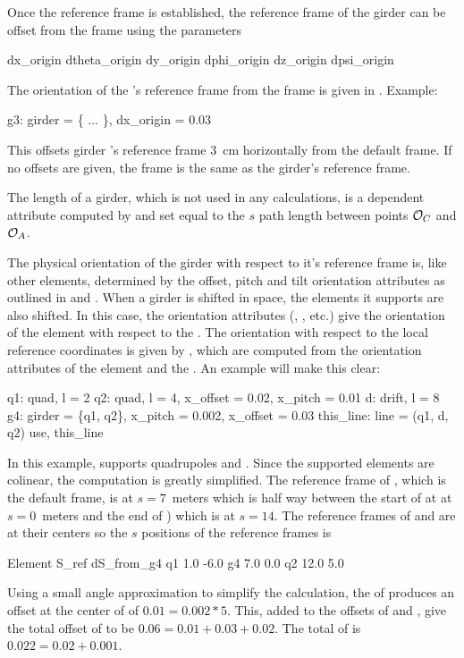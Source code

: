 Once the  reference frame is established, the reference
frame of the girder can be offset
from the  frame using the parameters
\begin{example}
  dx_origin    dtheta_origin
  dy_origin    dphi_origin
  dz_origin    dpsi_origin
\end{example} 
The orientation of the 's reference frame from the 
frame is given in . Example:
\begin{example}
  g3: girder = \{ ... \}, dx_origin = 0.03
\end{example}
This offsets girder 's reference frame 3~cm horizontally from
the default  frame. If no offsets are given, the
 frame is the same as the girder's reference frame.

The length  of a girder, which is not used in any calculations,
is a dependent attribute computed by \bmad and set equal to the $s$
path length between points ${\cal O}_C$ and ${\cal O}_A$.

The physical orientation of the girder with respect to it's reference
frame is, like other elements, determined by the offset, pitch and
tilt orientation attributes as outlined in  and
.  When a girder is shifted in space, the elements
it supports are also shifted.  In this case, the orientation
attributes (, , etc.) give the orientation of
the element with respect to the . The orientation with
respect to the local reference coordinates is given by
, which are computed from the orientation attributes
of the element and the . An example will make this clear:
\begin{example}
  q1: quad, l = 2
  q2: quad, l = 4, x_offset = 0.02, x_pitch = 0.01
  d: drift, l = 8
  g4: girder = \{q1, q2\}, x_pitch = 0.002, x_offset = 0.03
  this_line: line = (q1, d, q2)
  use, this_line
\end{example}
In this example,  supports quadrupoles  and .
Since the supported elements are colinear, the computation is greatly
simplified. The reference frame of , which is the default
 frame, is at $s = 7$~meters which is half way between the
start of  at at $s = 0$~meters and the end of ) which is
at $s = 14$. The reference frames of  and  are at their
centers so the $s$ positions of the reference frames is
\begin{example}
  Element        S_ref   dS_from_g4
  q1             1.0     -6.0
  g4             7.0      0.0
  q2            12.0      5.0
\end{example}
Using a small angle approximation to simplify the calculation, the
 of  produces an offset at the center of  of
$0.01 = 0.002 * 5$. This, added to the offsets of  and ,
give the total offset of  to be $0.06 = 0.01 + 0.03 + 0.02$.
The total  of  is $0.022 = 0.02 + 0.001$.

